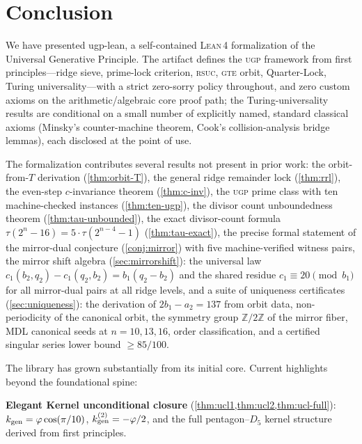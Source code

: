 \documentclass[11pt,a4paper]{article}
\theoremstyle{definition}
\newcommand{\ugp}{\textsc{ugp}}
\newcommand{\gte}{\textsc{gte}}
\newcommand{\rsuc}{\textsc{rsuc}}
\newcommand{\lean}{\textsc{Lean}\,4}
\begin{document}
\section{Conclusion}\label{sec:conclusion}

We have presented ugp-lean, a self-contained \lean{} formalization of
the Universal Generative Principle.  The artifact defines the \ugp{}
framework from first principles---ridge sieve, prime-lock criterion,
\rsuc{}, \gte{} orbit, Quarter-Lock, Turing universality---with a
strict zero-sorry policy throughout, and zero custom axioms on the
arithmetic/algebraic core proof path; the Turing-universality results are
conditional on a small number of explicitly named, standard classical axioms
(Minsky's counter-machine theorem, Cook's collision-analysis bridge lemmas),
each disclosed at the point of use.

The formalization contributes several results not present in prior work:
the orbit-from-$T$ derivation (\cref{thm:orbit-T}), the general ridge
remainder lock (\cref{thm:rrl}), the even-step $c$-invariance theorem
(\cref{thm:c-inv}), the \ugp{} prime class with ten machine-checked
instances (\cref{thm:ten-ugp}), the divisor count unboundedness theorem
(\cref{thm:tau-unbounded}), the exact divisor-count formula
$\tau(2^n - 16) = 5 \cdot \tau(2^{n-4}-1)$ (\cref{thm:tau-exact}),
the precise formal statement of the mirror-dual conjecture
(\cref{conj:mirror}) with five machine-verified witness pairs,
the mirror shift algebra (\cref{sec:mirrorshift}): the universal
law $c_1(b_2,q_2) - c_1(q_2,b_2) = b_1(q_2-b_2)$ and the shared
residue $c_1 \equiv 20 \pmod{b_1}$ for all mirror-dual pairs at all
ridge levels,
and a suite of uniqueness certificates (\cref{sec:uniqueness}):
the derivation of $2b_1 - a_2 = 137$ from orbit data,
non-periodicity of the canonical orbit, the symmetry group $\mathbb{Z}/2\mathbb{Z}$
of the mirror fiber, MDL canonical seeds at $n=10,13,16$, order classification,
and a certified singular series lower bound $\geq 85/100$.

The library has grown substantially from its initial core.  Current highlights
beyond the foundational spine:

\medskip
\noindent\textbf{Elegant Kernel unconditional closure}
(\cref{thm:ucl1,thm:ucl2,thm:ucl-full}):
$k_{\rm gen} = \varphi\cos(\pi/10)$, $k_{\rm gen}^{(2)} = -\varphi/2$,
and the full pentagon--$D_5$ kernel structure derived from first principles.
\end{document}
